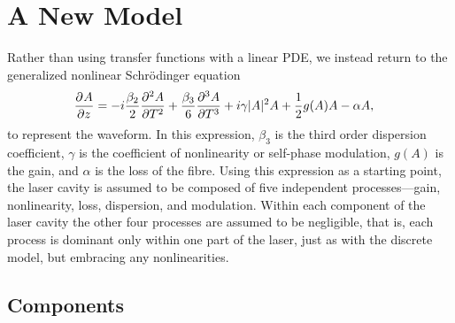 
\chapter{A New Model}
Rather than using transfer functions with a linear PDE, we instead return to the generalized nonlinear Schr\"odinger equation~\cite{agrawal2013, ferreira, shtyrina, yarutkina, burgoyne2007, peng} 
\begin{align}
\label{eq:nlse}
\pdiff{A}{z} &= - i \frac{\beta_2}{2}\pdiff[2]{A}{T} + \frac{\beta_3}{6}\pdiff[3]{A}{T} + i \gamma |A|^2 A + \frac{1}{2}g(A) A - \alpha A,
\end{align}
to represent the waveform. In this expression, $\beta_3$ is the third order dispersion coefficient, $\gamma$ is the coefficient of nonlinearity or self-phase modulation, $g(A)$ is the gain, and $\alpha$ is the loss of the fibre. Using this expression as a starting point, the laser cavity is assumed to be composed of five independent processes---gain, nonlinearity, loss, dispersion, and modulation. Within each component of the laser cavity the other four processes are assumed to be negligible, that is, each process is dominant only within one part of the laser, just as with the discrete model, but embracing any nonlinearities.

\section{Components}

